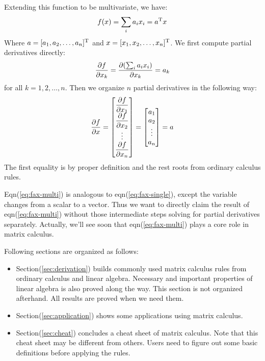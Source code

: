 Extending this function to be multivariate, we have:
\begin{equation}
	f(x) = \sum_{i}{a_ix_i} = a^\mathrm{T}x
\end{equation}
Where $a = [a_1,a_2,\ldots,a_n]^\mathrm{T}$ and 
$x = [x_1,x_2,\ldots,x_n]^\mathrm{T}$. 
We first compute partial derivatives directly:
\begin{equation}
	\dfrac{\partial f}{\partial x_k} = \dfrac{\partial (\sum_{i}{a_ix_i})}{\partial x_k} = a_k 
\end{equation}
for all $k=1,2, \ldots, n$. Then we organize $n$ partial derivatives
in the following way:
\begin{equation}
	\dfrac{\partial f}{\partial x} = \left[
	\begin{matrix}
		\dfrac{\partial f}{\partial x_1} \\
		\dfrac{\partial f}{\partial x_2} \\
		\vdots \\
		\dfrac{\partial f}{\partial x_n}
	\end{matrix}
	\right]
	= \left[
	\begin{matrix}
		a_1 \\
		a_2 \\
		\vdots \\
		a_n
	\end{matrix}
	\right]
	= a
	\label{eq:fax-multi}
\end{equation}
The first equality is by proper definition and the rest roots from 
ordinary calculus rules. 

Eqn(\ref{eq:fax-multi}) is analogous to eqn(\ref{eq:fax-single}), except
the variable changes from a scalar to a vector. Thus we want to directly 
claim the result of eqn(\ref{eq:fax-multi}) without those intermediate steps 
solving for partial derivatives separately. Actually, we'll see soon 
that eqn(\ref{eq:fax-multi}) plays a core role in matrix calculus. 

Following sections are organized as follows:
\begin{itemize}
	\item Section(\ref{sec:derivation}) builds commonly used 
	matrix calculus rules from ordinary calculus and linear 
	algebra. Necessary and important properties of linear 
	algebra is also proved along the way. This section is not 
	organized afterhand. All results are proved when we need them. 
	\item Section(\ref{sec:application}) shows some applications 
	using matrix calculus. 
	\item Section(\ref{sec:cheat}) concludes a cheat sheet of 
	matrix calculus. Note that this cheat sheet may be different 
	from others. Users need to figure out some basic definitions 
	before applying the rules. 
\end{itemize}


